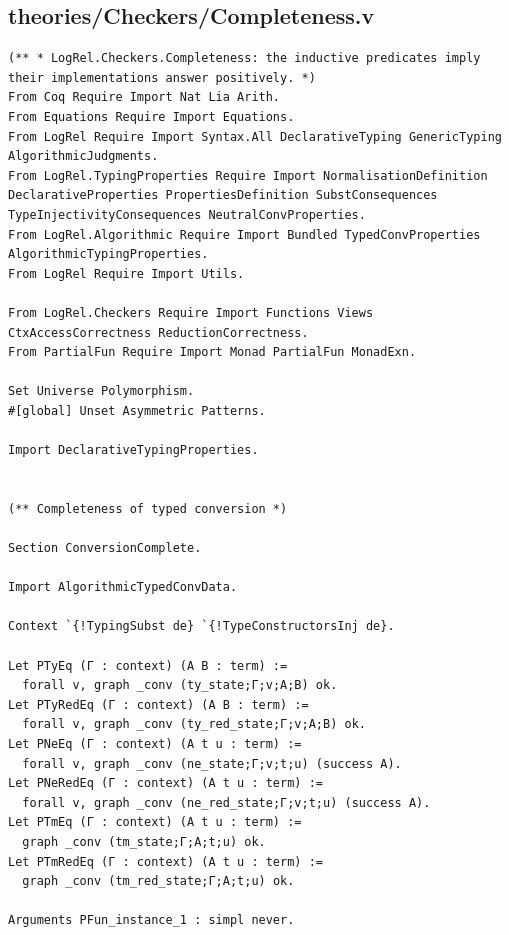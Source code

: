 \subsection*{theories/Checkers/Completeness.v}
\begin{lstlisting}
(** * LogRel.Checkers.Completeness: the inductive predicates imply their implementations answer positively. *)
From Coq Require Import Nat Lia Arith.
From Equations Require Import Equations.
From LogRel Require Import Syntax.All DeclarativeTyping GenericTyping AlgorithmicJudgments.
From LogRel.TypingProperties Require Import NormalisationDefinition DeclarativeProperties PropertiesDefinition SubstConsequences TypeInjectivityConsequences NeutralConvProperties.
From LogRel.Algorithmic Require Import Bundled TypedConvProperties AlgorithmicTypingProperties.
From LogRel Require Import Utils.

From LogRel.Checkers Require Import Functions Views CtxAccessCorrectness ReductionCorrectness.
From PartialFun Require Import Monad PartialFun MonadExn.

Set Universe Polymorphism.
#[global] Unset Asymmetric Patterns.

Import DeclarativeTypingProperties.


(** Completeness of typed conversion *)

Section ConversionComplete.

Import AlgorithmicTypedConvData.

Context `{!TypingSubst de} `{!TypeConstructorsInj de}.

Let PTyEq (Γ : context) (A B : term) :=
  forall v, graph _conv (ty_state;Γ;v;A;B) ok.
Let PTyRedEq (Γ : context) (A B : term) :=
  forall v, graph _conv (ty_red_state;Γ;v;A;B) ok. 
Let PNeEq (Γ : context) (A t u : term) :=
  forall v, graph _conv (ne_state;Γ;v;t;u) (success A).
Let PNeRedEq (Γ : context) (A t u : term) :=
  forall v, graph _conv (ne_red_state;Γ;v;t;u) (success A).
Let PTmEq (Γ : context) (A t u : term) := 
  graph _conv (tm_state;Γ;A;t;u) ok.
Let PTmRedEq (Γ : context) (A t u : term) :=
  graph _conv (tm_red_state;Γ;A;t;u) ok.

Arguments PFun_instance_1 : simpl never.


\end{lstlisting}
